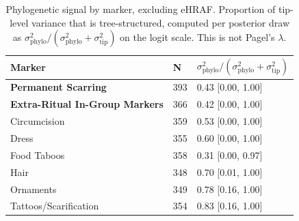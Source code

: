 \begin{table}[!ht]
\centering
\small
\caption{Phylogenetic signal by marker, excluding eHRAF. Proportion of tip-level variance that is tree-structured, computed per posterior draw as $\sigma^2_{\mathrm{phylo}} / (\sigma^2_{\mathrm{phylo}} + \sigma^2_{\mathrm{tip}})$ on the logit scale. This is not Pagel's $\lambda$.}
\label{tab:extnoehraf_phylo_signal}
\begin{tabular}{lll}
\toprule
Marker & N & $\sigma^2_{\mathrm{phylo}} / (\sigma^2_{\mathrm{phylo}} + \sigma^2_{\mathrm{tip}})$ \\
\midrule
\textbf{Permanent Scarring} & 393 & 0.43 [0.00, 1.00] \\
\textbf{Extra-Ritual In-Group Markers} & 366 & 0.42 [0.00, 1.00] \\
\midrule
Circumcision & 359 & 0.53 [0.00, 1.00] \\
Dress & 355 & 0.60 [0.00, 1.00] \\
Food Taboos & 358 & 0.31 [0.00, 0.97] \\
Hair & 348 & 0.70 [0.01, 1.00] \\
Ornaments & 349 & 0.78 [0.16, 1.00] \\
Tattoos/Scarification & 354 & 0.83 [0.16, 1.00] \\
\bottomrule
\end{tabular}
\end{table}